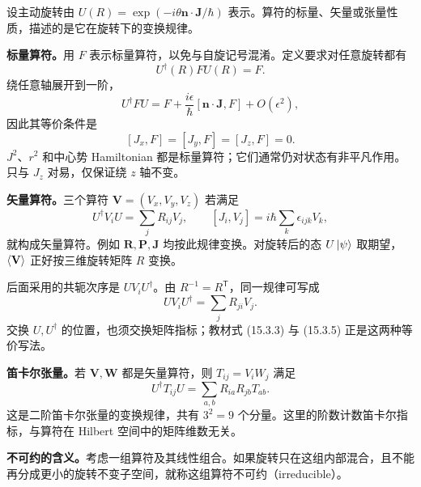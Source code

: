 设主动旋转由 $U(R)=\exp(-i\theta\mathbf n\cdot\mathbf J/\hbar)$ 表示。算符的标量、矢量或张量性质，描述的是它在旋转下的变换规律。

\textbf{标量算符。}用 $F$ 表示标量算符，以免与自旋记号混淆。定义要求对任意旋转都有
\begin{equation}
  U^\dagger(R)FU(R)=F.
\end{equation}
绕任意轴展开到一阶，
\begin{equation}
  U^\dagger FU=F+\frac{i\epsilon}{\hbar}[\mathbf n\cdot\mathbf J,F]
    +O(\epsilon^2),
\end{equation}
因此其等价条件是
\begin{equation}
  \boxed{[J_x,F]=[J_y,F]=[J_z,F]=0.}
\end{equation}
$J^2$、$r^2$ 和中心势 Hamiltonian 都是标量算符；它们通常仍对状态有非平凡作用。只与 $J_z$ 对易，仅保证绕 $z$ 轴不变。

\textbf{矢量算符。}三个算符 $\mathbf V=(V_x,V_y,V_z)$ 若满足
\begin{equation}
  \boxed{U^\dagger V_iU=\sum_jR_{ij}V_j,\qquad
    [J_i,V_j]=i\hbar\sum_k\epsilon_{ijk}V_k,}
\end{equation}
就构成矢量算符。例如 $\mathbf R,\mathbf P,\mathbf J$ 均按此规律变换。对旋转后的态 $U\left|\psi\right\rangle$ 取期望，$\left\langle \mathbf V \right\rangle$ 正好按三维旋转矩阵 $R$ 变换。

后面采用的共轭次序是 $UV_iU^\dagger$。由 $R^{-1}=R^{\mathsf T}$，同一规律可写成
\begin{equation}
  \boxed{UV_iU^\dagger=\sum_jR_{ji}V_j.}
\end{equation}
交换 $U,U^\dagger$ 的位置，也须交换矩阵指标；教材式 (15.3.3) 与 (15.3.5) 正是这两种等价写法。

\textbf{笛卡尔张量。}若 $\mathbf V,\mathbf W$ 都是矢量算符，则 $T_{ij}=V_iW_j$ 满足
\begin{equation}
  U^\dagger T_{ij}U=\sum_{a,b}R_{ia}R_{jb}T_{ab}.
\end{equation}
这是二阶笛卡尔张量的变换规律，共有 $3^2=9$ 个分量。这里的阶数计数笛卡尔指标，与算符在 Hilbert 空间中的矩阵维数无关。

\textbf{不可约的含义。}考虑一组算符及其线性组合。如果旋转只在这组内部混合，且不能再分成更小的旋转不变子空间，就称这组算符不可约（irreducible）。

